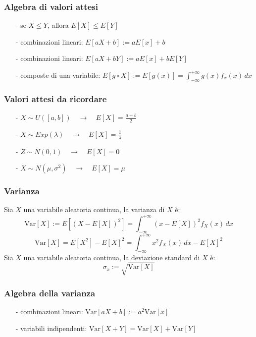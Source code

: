 \documentclass[a4paper]{article}
\newcommand\var{\text{Var}}   %
\begin{document}
\subsubsection*{Algebra di valori attesi}
\begin{itemize}[topsep=3pt, itemsep=0pt]
	\item[-] se \(X \leq Y\), allora \(E[X] \leq E[Y]\)
	\item[-] combinazioni lineari: \(E[aX + b] := aE[x] + b\)
	\item[-] combinazioni lineari: \(E[aX + bY] := aE[x] + bE[Y]\)
	\item[-] composte di una variabile: \(\displaystyle E[g \circ X] := E[g(x)] = \int_{-\infty}^{+\infty}  g(x) f_x(x) \, dx\)
\end{itemize}

\subsubsection*{Valori attesi da ricordare}
\begin{itemize}[topsep=3pt, itemsep=0pt]
	\item[-] \(X \sim U([a,b]) \quad \rightarrow \quad E[X] = \displaystyle\frac{a+b}{2}\)
	\item[-] \(X \sim Exp(\lambda) \quad \rightarrow \quad E[X] = \displaystyle\frac{1}{\lambda}\)
	\item[-] \(Z \sim N(0,1) \quad \rightarrow \quad E[X] = 0\)
	\item[-] \(X \sim N(\mu,\sigma^2) \quad \rightarrow \quad E[X] = \mu\)
\end{itemize}

\subsubsection*{Varianza}
Sia \(X\) una variabile aleatoria continua, la varianza di \(X\) è:
\[\var[X] := E[(X-E[X])^2] = \int_{-\infty}^{+\infty} (x - E[X])^2 f_X(x) \, dx\]
\[\var[X] = E[X^2] - E[X]^2 = \int_{-\infty}^{+\infty} x^2 f_X(x) \, dx - E[X]^2\]
Sia \(X\) una variabile aleatoria continua, la deviazione standard di \(X\) è:
\[\sigma_x := \sqrt{\var[X]}\]

\subsubsection*{Algebra della varianza}
\begin{itemize}[topsep=3pt, itemsep=0pt]
	\item[-] combinazioni lineari: \(\var[aX + b] := a^2\var[x]\)
	\item[-] variabili indipendenti: \(\var[X + Y] = \var[X] + \var[Y]\)
\end{itemize}
\end{document}
